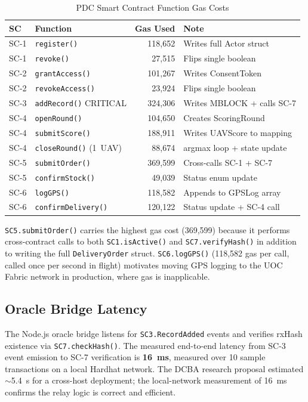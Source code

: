 \documentclass[sigplan,screen,review=false]{acmart}
\begin{document}
\begin{table}[h]
\centering
\caption{PDC Smart Contract Function Gas Costs}
\label{tab:gas}
\begin{tabular}{@{}p{1cm}p{2.5cm}rp{2cm}@{}}
\toprule
\textbf{SC} & \textbf{Function} & \textbf{Gas Used} & \textbf{Note} \\
\midrule
SC-1 & \texttt{register()}      & 118,652 & Writes full Actor struct \\
SC-1 & \texttt{revoke()}        &  27,515 & Flips single boolean \\
SC-2 & \texttt{grantAccess()}   & 101,267 & Writes ConsentToken \\
SC-2 & \texttt{revokeAccess()}  &  23,924 & Flips single boolean \\
SC-3 & \texttt{addRecord()} CRITICAL & 324,306 & Writes MBLOCK + calls SC-7 \\
SC-4 & \texttt{openRound()}     & 104,650 & Creates ScoringRound \\
SC-4 & \texttt{submitScore()}   & 188,911 & Writes UAVScore to mapping \\
SC-4 & \texttt{closeRound()} (1~UAV) &  88,674 & argmax loop + state update \\
SC-5 & \texttt{submitOrder()}   & 369,599 & Cross-calls SC-1 + SC-7 \\
SC-5 & \texttt{confirmStock()}  &  49,039 & Status enum update \\
SC-6 & \texttt{logGPS()}        & 118,582 & Appends to GPSLog array \\
SC-6 & \texttt{confirmDelivery()} & 120,122 & Status update + SC-4 call \\
\bottomrule
\end{tabular}
\end{table}

\texttt{SC5.submitOrder()} carries the highest gas cost (369,599)
because it performs cross-contract calls to both \texttt{SC1.isActive()}
and \texttt{SC7.verifyHash()} in addition to writing the full
\texttt{DeliveryOrder} struct. \texttt{SC6.logGPS()} (118,582 gas per
call, called once per second in flight) motivates moving GPS logging
to the UOC Fabric network in production, where gas is inapplicable.

\subsection{Oracle Bridge Latency}

The Node.js oracle bridge listens for \texttt{SC3.RecordAdded} events
and verifies rxHash existence via \texttt{SC7.checkHash()}. The
measured end-to-end latency from SC-3 event emission to SC-7
verification is \textbf{16~ms}, measured over 10 sample transactions
on a local Hardhat network. The DCBA research proposal estimated
$\sim$5.4~s for a cross-host deployment; the local-network measurement
of 16~ms confirms the relay logic is correct and efficient.
\end{document}
